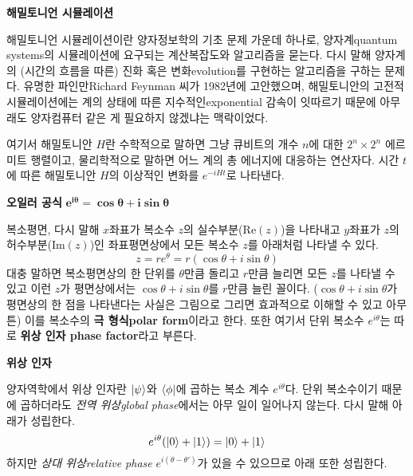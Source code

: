 \documentclass[a4paper,atbegshi,chapter]{oblivoir}
\begin{document}
\begin{mdframed}
  \begin{center}\textbf{해밀토니언 시뮬레이션}\end{center}\noindent
  해밀토니언 시뮬레이션이란 양자정보학의 기초 문제 가운데 하나로, 
  양자계{\footnotesize quantum systems}의 시뮬레이션에 요구되는 계산복잡도와
  알고리즘을 묻는다. 다시 말해 양자계의 (시간의 흐름을 따른) 진화 혹은
  변화{\footnotesize evolution}를 구현하는 알고리즘을 구하는 문제다. 
  유명한 파인만{\footnotesize Richard Feynman} 씨가 1982년에 고안했으며,
  해밀토니안의 고전적 시뮬레이션에는 계의 상태에 따른 
  지수적인{\footnotesize exponential} 감속이 잇따르기 때문에 아무래도
  양자컴퓨터 같은 게 필요하지 않겠냐는 맥락이었다. 

  여기서 해밀토니안 $H$란 수학적으로 말하면 그냥 큐비트의 개수 $n$에 대한
  $2^n\times 2^n$ 에르미트 행렬이고, 물리학적으로 말하면 어느 계의 총 에너지에
  대응하는 연산자다. 시간 $t$에 따른 해밀토니안 $H$의 이상적인 변화를
  $e^{-iHt}$로 나타낸다. 
  \begin{mdframed}
    \begin{center}\textbf{오일러 공식} $\pmb{e^{i\theta}=\cos\theta+
    i\sin\theta}$ \end{center}
    복소평면, 다시 말해 $x$좌표가 복소수 $z$의 실수부분($\textrm{Re}(z)$)을
    나타내고 $y$좌표가 $z$의 허수부분($\textrm{Im}(z)$)인 좌표평면상에서
    모든 복소수 $z$를 아래처럼 나타낼 수 있다.
    \[
      z=re^{\theta}=r(\cos\theta+i\sin\theta)
    \]
    대충 말하면 복소평면상의 한 단위를 $\theta$만큼 돌리고 $r$만큼 늘리면
    모든 $z$를 나타낼 수 있고 이런 $z$가 평면상에서는 $\cos\theta+i\sin\theta$를
    $r$만큼 늘린 꼴이다. ($\cos\theta+i\sin\theta$가 평면상의 한 점을
    나타낸다는 사실은 그림으로 그리면 효과적으로 이해할 수 있고 아무튼)
    이를 복소수의 \textbf{극 형식\footnotesize polar form}이라고 한다.
    또한 여기서 단위 복소수 $e^{i\theta}$는 따로 \textbf{위상 인자\footnotesize
    phase factor}라고 부른다.
    \begin{mdframed}
      \begin{center}\textbf{위상 인자}\end{center}\noindent
      양자역학에서 위상 인자란 $\ket{\psi}$와 $\bra{\phi}$에 곱하는
      복소 계수 $e^{i\theta}$다. 단위 복소수이기 때문에 곱하더라도 
      \emph{전역 위상\footnotesize global phase}에서는 아무 일이 일어나지
      않는다. 다시 말해 아래가 성립한다.
      \[
        e^{i\theta}(\ket0+\ket1)=\ket0+\ket1
      \]
      하지만 \emph{상대 위상\emph relative phase}
      $e^{i(\theta-\theta')}$가 있을 수 있으므로 아래 또한 성립한다.

\end{mdframed}
\end{mdframed}
\end{mdframed}
\end{document}
